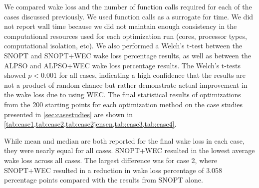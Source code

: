 \documentclass[hidelinks,sort&compress,AMA,STIX1COL]{WileyNJD-v2}
\begin{document}

We compared wake loss and the number of function calls required for each of the cases discussed previously. We used function calls as a surrogate for time. We did not report wall time because we did not maintain enough consistency in the computational resources used for each optimization run (cores, processor types, computational isolation, etc). We also performed a Welch's t-test between the SNOPT and SNOPT+WEC wake loss percentage results, as well as between the ALPSO and ALPSO+WEC wake loss percentage results. The Welch's t-tests showed $p<0.001$ for all cases, indicating a high confidence that the results are not a product of random chance but rather demonstrate actual improvement in the wake loss due to using WEC. The final statistical results of optimizations from the 200 starting points for each optimization method on the case studies presented in \cref{sec:casestudies} are shown in \cref{tab:case1,tab:case2,tab:case2jensen,tab:case3,tab:case4}. 

 While mean and median are both reported for the final wake loss in each case, they were nearly equal for all cases. SNOPT+WEC resulted in the lowest average wake loss across all cases. The largest difference was for case 2, where SNOPT+WEC resulted in a reduction in wake loss percentage of 3.058 percentage points compared with the results from SNOPT alone.
\end{document}
